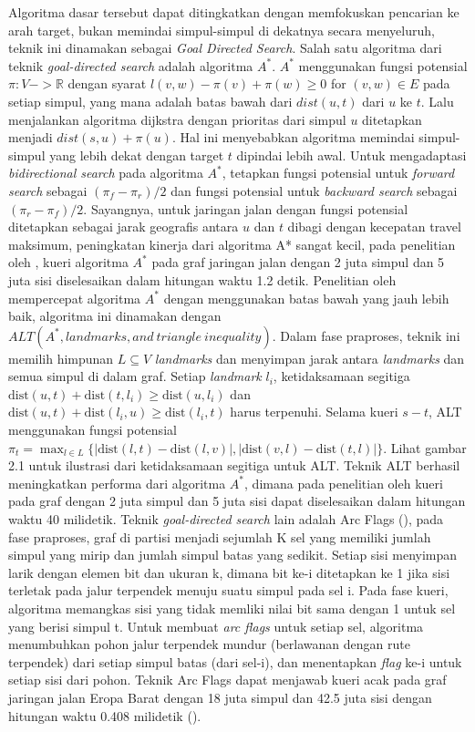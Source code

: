 Algoritma dasar tersebut dapat ditingkatkan dengan memfokuskan pencarian ke arah target, bukan memindai simpul-simpul di dekatnya secara menyeluruh, teknik ini dinamakan sebagai \textit{Goal Directed Search}. Salah satu algoritma dari teknik \textit{goal-directed search} adalah algoritma $A^*$. $A^*$ menggunakan fungsi potensial $\pi:V->\mathbb{R}$ dengan syarat $l(v,w)-\pi(v)+\pi(w)\ge0$ for $(v,w)\in E$  pada setiap simpul, yang mana adalah batas bawah dari $dist(u,t)$ dari $u$ ke $t$. Lalu menjalankan algoritma dijkstra dengan prioritas dari simpul $u$ ditetapkan menjadi $dist(s,u)+\pi(u)$.  Hal ini menyebabkan algoritma memindai simpul-simpul yang lebih dekat dengan target $t$ dipindai lebih awal. Untuk mengadaptasi \textit{bidirectional search} pada algoritma $A^*$, tetapkan fungsi potensial untuk \textit{forward search} sebagai $(\pi_f-\pi_r)/2$  dan fungsi potensial untuk \textit{backward search} sebagai $(\pi_r-\pi_f)/2$. Sayangnya, untuk jaringan jalan dengan fungsi potensial ditetapkan sebagai jarak geografis antara $u$ dan $t$ dibagi dengan kecepatan travel maksimum, peningkatan kinerja dari algoritma A* sangat kecil, pada penelitian oleh \cite{Goldberg2005}, kueri algoritma $A^*$ pada graf jaringan jalan dengan 2 juta simpul dan 5 juta sisi diselesaikan dalam hitungan waktu 1.2 detik. Penelitian oleh \cite{Goldberg2005} mempercepat algoritma $A^*$ dengan menggunakan batas bawah yang jauh lebih baik, algoritma ini dinamakan dengan $ALT(A^*,landmarks, and \ triangle \ inequality)$. Dalam fase praproses, teknik ini memilih himpunan $L\subseteq V$ \textit{landmarks} dan menyimpan jarak antara \textit{landmarks} dan semua simpul di dalam graf. Setiap \textit{landmark} $l_i$, ketidaksamaan segitiga $\text{dist}(u,t)+\text{dist}(t,l_i)\geq\text{dist}(u,l_i)$ dan $\text{dist}(u,t)+\text{dist}(l_i,u)\geq\text{dist}(l_i,t)$ harus terpenuhi. Selama kueri $s-t$, ALT menggunakan fungsi potensial $\pi_t=\max_{l \in L} \Big\{ | \text{dist}(l,t)-\text{dist}(l,v)|,|\text{dist}(v,l)-\text{dist}(t,l)|\Big\}$. Lihat gambar 2.1 untuk ilustrasi dari ketidaksamaan segitiga untuk ALT. Teknik ALT berhasil meningkatkan performa dari algoritma $A^*$, dimana pada penelitian oleh \cite{Goldberg2005} kueri pada graf dengan 2 juta simpul dan 5 juta sisi dapat diselesaikan dalam hitungan waktu 40 milidetik. Teknik \textit{goal-directed search} lain adalah Arc Flags (\cite{Kohler2005}), pada fase praproses, graf di partisi menjadi sejumlah K sel yang memiliki jumlah simpul yang mirip dan jumlah simpul batas yang sedikit. Setiap sisi menyimpan larik dengan elemen bit dan ukuran k, dimana bit ke-i ditetapkan ke 1 jika sisi terletak pada jalur terpendek menuju suatu simpul pada sel i. Pada fase kueri, algoritma memangkas sisi yang tidak memliki nilai bit sama dengan 1 untuk sel yang berisi simpul t. Untuk membuat \textit{arc flags} untuk setiap sel, algoritma menumbuhkan pohon jalur terpendek mundur (berlawanan dengan rute terpendek) dari setiap simpul batas (dari sel-i), dan menentapkan \textit{flag} ke-i untuk setiap sisi dari pohon. Teknik Arc Flags dapat menjawab kueri acak pada graf jaringan jalan Eropa Barat dengan 18 juta simpul dan 42.5 juta sisi dengan hitungan waktu 0.408 milidetik (\cite{Bast2015}).


